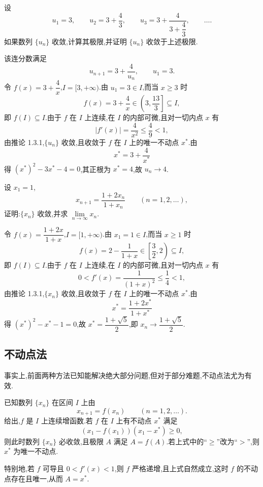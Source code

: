 \begin{example}
  设
  \[
    u_1=3,
    \qquad
    u_2=3+\dfrac{4}{3},
    \qquad
    u_3=3+\dfrac{4}{3+\dfrac{4}{3}},
    \qquad\ldots.
  \]
  如果数列 $\{u_n\}$ 收敛,计算其极限,并证明 $\{u_n\}$ 收敛于上述极限.
\end{example}
\exampleblank

\begin{solution}
  该连分数满足
  \[
    u_{n+1}=3+\dfrac{4}{u_n},
    \qquad u_1=3.
  \]
  令 $f(x)=3+\dfrac{4}{x}$,$I=\lbrack3,+\infty)$.由 $u_1=3\in I$,而当 $x\geq3$ 时
  \[
    f(x)=3+\dfrac{4}{x}\in\left(3,\dfrac{13}{3}\right\rbrack\subseteq I,
  \]
  即 $f(I)\subseteq I$.由于 $f$ 在 $I$ 上连续,在 $I$ 的内部可微,且对一切内点 $x$ 有
  \[
    |f'(x)|=\dfrac{4}{x^2}\leq\dfrac{4}{9}<1,
  \]
  由推论 1.3.1,$\{u_n\}$ 收敛,且收敛于 $f$ 在 $I$ 上的唯一不动点 $x^*$.由
  \[
    x^*=3+\dfrac{4}{x^*}
  \]
  得 $(x^*)^2-3x^*-4=0$,其正根为 $x^*=4$,故 $u_n\to4$.
\end{solution}

\begin{example}
  设 $x_1=1$,
  \[
    x_{n+1}=\dfrac{1+2x_n}{1+x_n}\qquad(n=1,2,\ldots),
  \]
  证明:$\{x_n\}$ 收敛,并求 $\displaystyle \lim\limits_{n\to\infty}x_n$.
\end{example}
\exampleblank

\begin{solution}
  令 $f(x)=\dfrac{1+2x}{1+x}$,$I=\lbrack1,+\infty)$.由 $x_1=1\in I$,而当 $x\geq1$ 时
  \[
    f(x)=2-\dfrac{1}{1+x}\in\left\lbrack\dfrac{3}{2},2\right)\subseteq I,
  \]
  即 $f(I)\subseteq I$.由于 $f$ 在 $I$ 上连续,在 $I$ 的内部可微,且对一切内点 $x$ 有
  \[
    0<f'(x)=\dfrac{1}{(1+x)^2}\leq\dfrac{1}{4}<1,
  \]
  由推论 1.3.1,$\{x_n\}$ 收敛,且收敛于 $f$ 在 $I$ 上的唯一不动点 $x^*$.由
  \[
    x^*=\dfrac{1+2x^*}{1+x^*}
  \]
  得 $(x^*)^2-x^*-1=0$,故 $x^*=\dfrac{1+\sqrt5}{2}$,即 $x_n\to\dfrac{1+\sqrt5}{2}$.
\end{solution}



\subsection{不动点法}

事实上,前面两种方法已知能解决绝大部分问题,但对于部分难题,不动点法尤为有效.

\begin{proposition}[\markstar]
  已知数列 $\{x_n\}$ 在区间 $I$ 上由
  \[
    x_{n+1}=f(x_n)\qquad(n=1,2,\ldots).
  \]
  给出,$f$ 是 $I$ 上连续增函数.若 $f$ 在 $I$ 上有不动点 $x^*$ 满足
  \[
    (x_1-f(x_1))(x_1-x^*)\geq0,
  \]
  则此时数列 $\{x_n\}$ 必收敛,且极限 $A$ 满足 $A=f(A)$.若上式中的``$\geq$''改为``$>$'',则 $x^*$ 为唯一不动点.

  特别地,若 $f$ 可导且 $0<f'(x)<1$,则 $f$ 严格递增,且上式自然成立,这时 $f$ 的不动点存在且唯一,从而 $A=x^*$.
\end{proposition}

